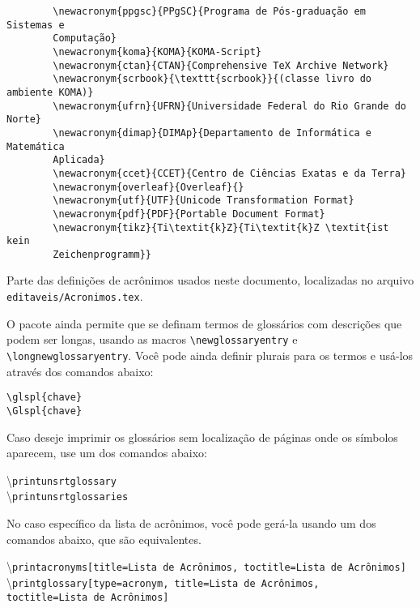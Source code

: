 \begin{listing}[ht]
	\begin{verbatim}
		\newacronym{ppgsc}{PPgSC}{Programa de Pós-graduação em Sistemas e 
		Computação}
		\newacronym{koma}{KOMA}{KOMA-Script}
		\newacronym{ctan}{CTAN}{Comprehensive TeX Archive Network}
		\newacronym{scrbook}{\texttt{scrbook}}{(classe livro do ambiente KOMA)}
		\newacronym{ufrn}{UFRN}{Universidade Federal do Rio Grande do Norte}
		\newacronym{dimap}{DIMAp}{Departamento de Informática e Matemática 
		Aplicada}
		\newacronym{ccet}{CCET}{Centro de Ciências Exatas e da Terra}
		\newacronym{overleaf}{Overleaf}{}
		\newacronym{utf}{UTF}{Unicode Transformation Format}
		\newacronym{pdf}{PDF}{Portable Document Format}
		\newacronym{tikz}{Ti\textit{k}Z}{Ti\textit{k}Z \textit{ist kein 
		Zeichenprogramm}}
	\end{verbatim}
	\caption{Parte das definições de acrônimos usados neste documento, localizadas no arquivo \texttt{editaveis/Acronimos.tex}.}
	\label{cod:acronimos}
\end{listing}

O pacote ainda permite que se definam termos de glossários com descrições que podem ser longas, usando as macros \texttt{\textbackslash{}newglossaryentry} e \texttt{\textbackslash{}longnewglossaryentry}. Você pode ainda definir plurais para os termos e usá-los através dos comandos abaixo: 

\begin{adjustbox}{fbox, center, tabular=l, vspace=0.5cm}
	\texttt{\textbackslash{}glspl\{chave\}} \\
	\texttt{\textbackslash{}Glspl\{chave\}}
\end{adjustbox}

Caso deseje imprimir os glossários sem localização de páginas onde os símbolos aparecem, use um dos comandos abaixo: 

\begin{adjustbox}{fbox, center, tabular=l, vspace=0.5cm}
	\textbackslash\texttt{printunsrtglossary} \\
	\textbackslash\texttt{printunsrtglossaries}
\end{adjustbox}

No caso específico da lista de acrônimos, você pode gerá-la usando um dos comandos abaixo, que são equivalentes.

\begin{adjustbox}{fbox, center, tabular=l, vspace=0.5cm}
\textbackslash\texttt{printacronyms[title=Lista de Acrônimos, toctitle=Lista de Acrônimos]} \\
\textbackslash\texttt{printglossary[type=acronym, title=Lista de Acrônimos,} \\
\texttt{toctitle=Lista de Acrônimos]}
\end{adjustbox}

